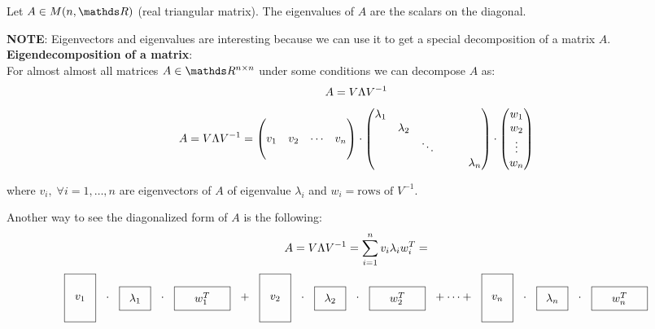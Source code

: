 \documentclass[computationalMathematics.tex]{subfiles}
\begin{document}
\begin{proposition}
  Let $A \in M(n, \R)$ (real triangular matrix). The eigenvalues of $A$ are the scalars on the diagonal.
\end{proposition}


\noindent \textbf{NOTE}: Eigenvectors and eigenvalues are interesting because we can use it to get a special decomposition of a matrix $A$.\\

\noindent \textbf{Eigendecomposition of a matrix}:\\
For almost almost all matrices $A \in \R^{n \times n}$ under some conditions we can decompose $A$ as:
\[
  A = V \Lambda {V}^{-1}
\]
\[
  A = V \Lambda {V}^{-1} = \begin{pmatrix}
    \\
    v_1 & v_2 & \cdots & v_n\\
    \\
  \end{pmatrix}
  \cdot 
  \begin{pmatrix}
    \lambda_1\\
    &\lambda_2\\
    && \ddots\\
    &&&&&\lambda_n\\
  \end{pmatrix}
  \cdot 
  \begin{pmatrix}
    w_1\\
    w_2\\
    \vdots\\
    w_n\\
  \end{pmatrix}
\]

where $v_i, \; \forall i=1, \ldots, n$ are eigenvectors of $A$ of eigenvalue $\lambda_i$ and $w_i = \text{rows of } V^{-1}$.\\

Another way to see the diagonalized form of $A$ is the following:
\[
  A = V \Lambda {V}^{-1} = \sum\limits_{i=1}^{n} v_i\lambda_i w_i^T = 
\]
\[
  \tallthin{$v_1$} \cdot \real{$\lambda_1$} \cdot \shortlarge{$w_1^T$} + \tallthin{$v_2$} \cdot \real{$\lambda_2$} \cdot \shortlarge{$w_2^T$} + \cdots + \tallthin{$v_n$} \cdot \real{$\lambda_n$} \cdot \shortlarge{$w_n^T$}
\]
\end{document}
